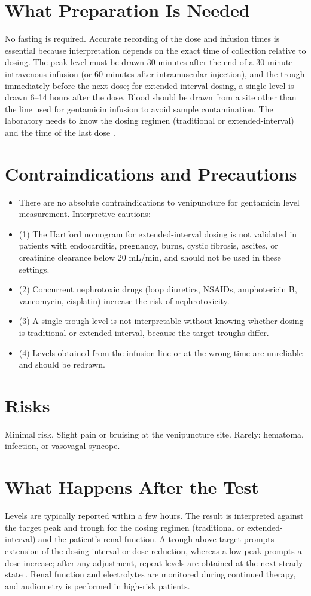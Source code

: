 \section*{What Preparation Is Needed}
No fasting is required. Accurate recording of the dose and infusion times is essential because interpretation depends on the exact time of collection relative to dosing. The peak level must be drawn 30 minutes after the end of a 30-minute intravenous infusion (or 60 minutes after intramuscular injection), and the trough immediately before the next dose; for extended-interval dosing, a single level is drawn 6--14 hours after the dose. Blood should be drawn from a site other than the line used for gentamicin infusion to avoid sample contamination. The laboratory needs to know the dosing regimen (traditional or extended-interval) and the time of the last dose \cite{avent2011current}.

\section*{Contraindications and Precautions}
\begin{itemize}
  \item There are no absolute contraindications to venipuncture for gentamicin level measurement. Interpretive cautions:
  \item (1) The Hartford nomogram for extended-interval dosing is not validated in patients with endocarditis, pregnancy, burns, cystic fibrosis, ascites, or creatinine clearance below 20 mL/min, and should not be used in these settings.
  \item (2) Concurrent nephrotoxic drugs (loop diuretics, NSAIDs, amphotericin B, vancomycin, cisplatin) increase the risk of nephrotoxicity.
  \item (3) A single trough level is not interpretable without knowing whether dosing is traditional or extended-interval, because the target troughs differ.
  \item (4) Levels obtained from the infusion line or at the wrong time are unreliable and should be redrawn.
\end{itemize}
\section*{Risks}
Minimal risk. Slight pain or bruising at the venipuncture site. Rarely: hematoma, infection, or vasovagal syncope.

\section*{What Happens After the Test}
Levels are typically reported within a few hours. The result is interpreted against the target peak and trough for the dosing regimen (traditional or extended-interval) and the patient's renal function. A trough above target prompts extension of the dosing interval or dose reduction, whereas a low peak prompts a dose increase; after any adjustment, repeat levels are obtained at the next steady state \cite{bartal2003pharmacokinetic}. Renal function and electrolytes are monitored during continued therapy, and audiometry is performed in high-risk patients.

